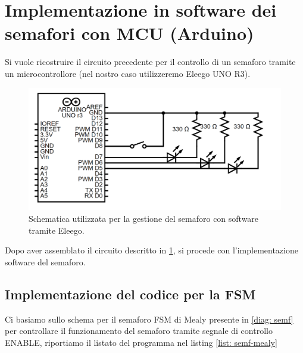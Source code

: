 \documentclass[10pt, a4paper, italian]{article}
\begin{document}
\section{Implementazione in software dei semafori con MCU (Arduino)}
Si vuole ricostruire il circuito precedente per il controllo di un semaforo
tramite un microcontrollore (nel nostro caso utilizzeremo Eleego UNO R3).
\begin{figure}[htbp]
    \centering
    \includegraphics[width=\textwidth]{schem_ard}
    \caption{Schematica utilizzata per la gestione del semaforo con software
    tramite Eleego.
    \label{schem: arduino}}
\end{figure}
Dopo aver assemblato il circuito descritto in \cref{schem: arduino}, si
procede con l'implementazione software del semaforo.

\subsection{Implementazione del codice per la FSM}
Ci basiamo sullo schema per il semaforo FSM di Mealy presente in
\cref{diag: semf} per controllare il funzionamento del semaforo tramite
segnale di controllo ENABLE, riportiamo il listato del programma nel listing
\ref{list: semf-mealy}

\end{document}
